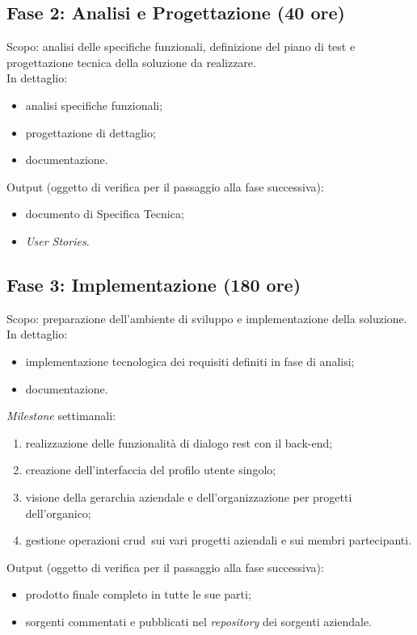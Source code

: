 \subsection{Fase 2: Analisi e Progettazione (40 ore)}
Scopo: analisi delle specifiche funzionali, definizione del piano di test e progettazione tecnica
della soluzione da realizzare.\\
In dettaglio:
\begin{itemize}
	\item analisi specifiche funzionali;
	\item progettazione di dettaglio;
	\item documentazione.
\end{itemize}
Output (oggetto di verifica per il passaggio alla fase successiva):
\begin{itemize}
	\item documento di Specifica Tecnica;
	\item \emph{User Stories}.
\end{itemize}

\subsection{Fase 3: Implementazione (180 ore)}
Scopo: preparazione dell’ambiente di sviluppo e implementazione della soluzione.\\
In dettaglio:
\begin{itemize}
	\item implementazione tecnologica dei requisiti definiti in fase di analisi;
	\item documentazione.
\end{itemize}
\emph{Milestone} settimanali:
\begin{enumerate}
	\item realizzazione delle funzionalità di dialogo \gls{rest} con il \gls{back-end};
	\item creazione dell'interfaccia del profilo utente singolo;
	\item visione della gerarchia aziendale e dell'organizzazione per progetti dell'organico;
	\item gestione operazioni \gls{crud}\glsfirstoccur\  sui vari progetti aziendali e sui membri partecipanti.
\end{enumerate}
Output (oggetto di verifica per il passaggio alla fase successiva):
\begin{itemize}
	\item prodotto finale completo in tutte le sue parti;
	\item sorgenti commentati e pubblicati nel \emph{repository} dei sorgenti aziendale.
\end{itemize}

